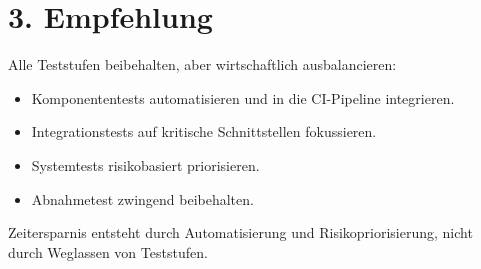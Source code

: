 \documentclass[
	fontsize=12pt,          %
	paper=a4,               %
	numbers=noenddot,       %
	listof=totoc,           %
	listof=entryprefix,     %
	listof=nochaptergap,    %
	bibliography=totoc,     %
	parskip=half,           %
	openany                 %
]{scrbook}
\begin{document}
\section*{3. Empfehlung}

Alle Teststufen beibehalten, aber wirtschaftlich ausbalancieren:
\begin{itemize}
	\item Komponententests automatisieren und in die CI-Pipeline integrieren.
	\item Integrationstests auf kritische Schnittstellen fokussieren.
	\item Systemtests risikobasiert priorisieren.
	\item Abnahmetest zwingend beibehalten.
\end{itemize}
Zeitersparnis entsteht durch Automatisierung und Risikopriorisierung, nicht durch Weglassen von Teststufen.


\end{document}
